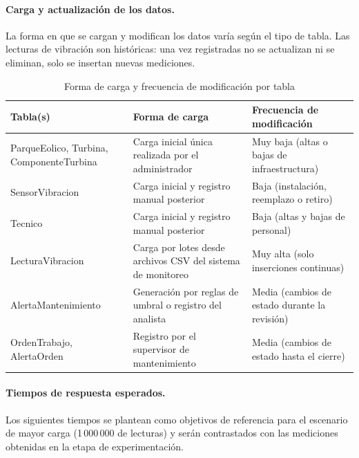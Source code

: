 \documentclass[11pt,a4paper]{article}
\begin{document}
\paragraph{Carga y actualización de los datos.}
La forma en que se cargan y modifican los datos varía según el tipo de tabla. Las
lecturas de vibración son históricas: una vez registradas no se actualizan ni se
eliminan, solo se insertan nuevas mediciones.

\begin{table}[H]
\centering
\small
\caption{Forma de carga y frecuencia de modificación por tabla}
\label{tab:carga_datos}
\begin{tabular}{|p{4.2cm}|p{5.4cm}|p{4.8cm}|}
\hline
\textbf{Tabla(s)} & \textbf{Forma de carga} & \textbf{Frecuencia de modificación} \\ \hline
ParqueEolico, Turbina, ComponenteTurbina & Carga inicial única realizada por el administrador & Muy baja (altas o bajas de infraestructura) \\ \hline
SensorVibracion & Carga inicial y registro manual posterior & Baja (instalación, reemplazo o retiro) \\ \hline
Tecnico & Carga inicial y registro manual posterior & Baja (altas y bajas de personal) \\ \hline
LecturaVibracion & Carga por lotes desde archivos CSV del sistema de monitoreo & Muy alta (solo inserciones continuas) \\ \hline
AlertaMantenimiento & Generación por reglas de umbral o registro del analista & Media (cambios de estado durante la revisión) \\ \hline
OrdenTrabajo, AlertaOrden & Registro por el supervisor de mantenimiento & Media (cambios de estado hasta el cierre) \\ \hline
\end{tabular}
\end{table}

\paragraph{Tiempos de respuesta esperados.}
Los siguientes tiempos se plantean como objetivos de referencia para el escenario de
mayor carga (1\,000\,000 de lecturas) y serán contrastados con las mediciones
obtenidas en la etapa de experimentación.
\end{document}
